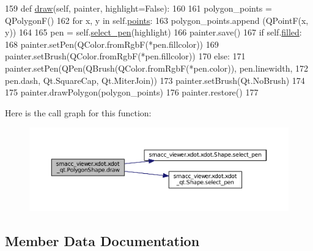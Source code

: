 \begin{DoxyCode}
159     \textcolor{keyword}{def }\hyperlink{classsmacc__viewer_1_1xdot_1_1xdot__qt_1_1PolygonShape_a44baa5c301e9c19e075bee254320f47c}{draw}(self, painter, highlight=False):
160 
161         polygon\_points = QPolygonF()
162         \textcolor{keywordflow}{for} x, y \textcolor{keywordflow}{in} self.\hyperlink{classsmacc__viewer_1_1xdot_1_1xdot__qt_1_1PolygonShape_a01107adea1ab0c6fc4c369c32e5f3393}{points}:
163             polygon\_points.append (QPointF(x, y))
164 
165         pen = self.\hyperlink{classsmacc__viewer_1_1xdot_1_1xdot__qt_1_1Shape_a7f20c9ecdb3c6117b8d1185c8155b122}{select\_pen}(highlight)
166         painter.save()
167         \textcolor{keywordflow}{if} self.\hyperlink{classsmacc__viewer_1_1xdot_1_1xdot__qt_1_1PolygonShape_a7e3ac7cdc3243a36dc0068d180673a71}{filled}:
168             painter.setPen(QColor.fromRgbF(*pen.fillcolor))
169             painter.setBrush(QColor.fromRgbF(*pen.fillcolor))
170         \textcolor{keywordflow}{else}:
171             painter.setPen(QPen(QBrush(QColor.fromRgbF(*pen.color)), pen.linewidth,
172                                             pen.dash, Qt.SquareCap, Qt.MiterJoin))
173             painter.setBrush(Qt.NoBrush)
174 
175         painter.drawPolygon(polygon\_points)
176         painter.restore()
177 
\end{DoxyCode}


Here is the call graph for this function\+:
\nopagebreak
\begin{figure}[H]
\begin{center}
\leavevmode
\includegraphics[width=350pt]{classsmacc__viewer_1_1xdot_1_1xdot__qt_1_1PolygonShape_a44baa5c301e9c19e075bee254320f47c_cgraph}
\end{center}
\end{figure}




\subsection{Member Data Documentation}
